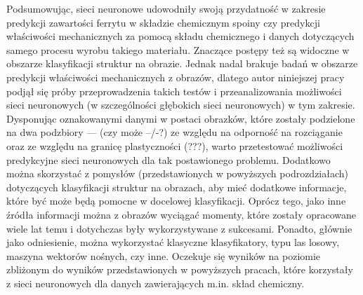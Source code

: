 Podsumowując, sieci neuronowe udowodniły swoją przydatność w zakresie predykcji zawartości ferrytu w składzie chemicznym spoiny czy predykcji właściwości mechanicznych za pomocą składu chemicznego i danych dotyczących samego procesu wyrobu takiego materiału. Znaczące postępy też są widoczne w obszarze klasyfikacji struktur na obrazie. Jednak nadal brakuje badań w obszarze predykcji właściwości mechanicznych z obrazów, dlatego autor niniejszej pracy podjął się próby przeprowadzenia takich testów i przeanalizowania możliwości sieci neuronowych (w szczególności głębokich sieci neuronowych) w tym zakresie. Dysponując oznakowanymi danymi w postaci obrazków, które zostały podzielone na dwa podzbiory — (czy może –/-?)  ze względu na odporność na rozciąganie oraz ze względu na granicę plastyczności (???), warto przetestować możliwości predykcyjne sieci neuronowych dla tak postawionego problemu. Dodatkowo można skorzystać z pomysłów (przedstawionych w powyższych podrozdziałach) dotyczących klasyfikacji struktur na obrazach, aby mieć dodatkowe informacje, które być może będą pomocne w docelowej klasyfikacji. Oprócz tego, jako inne źródła informacji można z obrazów wyciągać momenty, które zostały opracowane wiele lat temu i dotychczas były wykorzystywane z sukcesami. Ponadto, głównie jako odniesienie, można wykorzystać klasyczne klasyfikatory, typu las losowy, maszyna wektorów nośnych, czy inne. Oczekuje się wyników na poziomie zbliżonym do wyników przedstawionych w powyższych pracach, które korzystały z sieci neuronowych dla danych zawierających m.in. skład chemiczny.  







